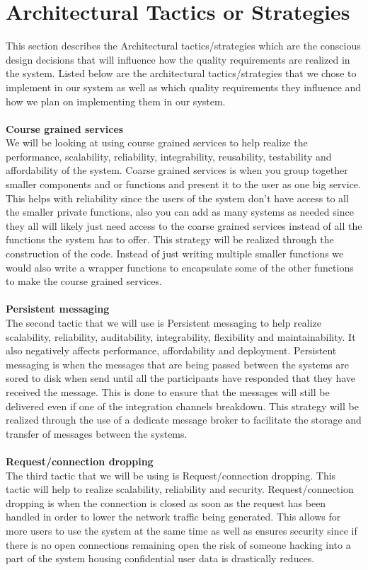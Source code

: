 \documentclass[a4paper]{article}
\begin{document}
\section{Architectural Tactics or Strategies}
This section describes the Architectural tactics/strategies which are the conscious design decisions that will influence how the quality requirements are realized in the system. Listed below are the architectural tactics/strategies that we chose to implement in our system as well as which quality requirements they influence and how we plan on implementing them in our system. 
\\
\\\textbf{Course grained services}
\\We will be looking at using course grained services to help realize the performance, scalability, reliability, integrability, reusability, testability and affordability of the system. Coarse grained services is when you group together smaller components and or functions and present it to the user as one big service. This helps with reliability since the users of the system don’t have access to all the smaller private functions, also you can add as many systems as needed since they all will likely just need access to the coarse grained services instead of all the functions the system has to offer.
This strategy will be realized through the construction of the code. Instead of just writing multiple smaller functions we would also write a wrapper functions to encapsulate some of the other functions to make the course grained services. 
\\
\\\textbf{Persistent messaging}
\\The second tactic that we will use is Persistent messaging to help realize scalability, reliability, auditability, integrability, flexibility and maintainability. It also negatively affects performance, affordability and deployment. Persistent messaging is when the messages that are being passed between the systems are sored to disk when send until all the participants have responded that they have received the message. This is done to ensure that the messages will still be delivered even if one of the integration channels breakdown.
This strategy will be realized through the use of a dedicate message broker to facilitate the storage and transfer of messages between the systems. 
\\
\\\textbf{Request/connection dropping}
\\The third tactic that we will be using is Request/connection dropping. This tactic will help to realize scalability, reliability and security. Request/connection dropping is when the connection is closed as soon as the request has been handled in order to lower the network traffic being generated. This allows for more users to use the system at the same time as well as ensures security since if there is no open connections remaining open the risk of someone hacking into a part of the system housing confidential user data is drastically reduces. 
\end{document}
